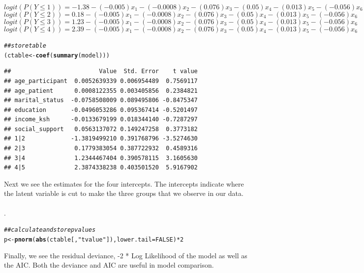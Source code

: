 \documentclass[12pt]{article}\usepackage[]{graphicx}\usepackage[]{xcolor}
\makeatletter
\newcommand{\hlnum}[1]{\textcolor[rgb]{0.686,0.059,0.569}{#1}}%
\newcommand{\hlstr}[1]{\textcolor[rgb]{0.192,0.494,0.8}{#1}}%
\newcommand{\hlcom}[1]{\textcolor[rgb]{0.678,0.584,0.686}{\textit{#1}}}%
\newcommand{\hlopt}[1]{\textcolor[rgb]{0,0,0}{#1}}%
\newcommand{\hlstd}[1]{\textcolor[rgb]{0.345,0.345,0.345}{#1}}%
\newcommand{\hlkwb}[1]{\textcolor[rgb]{0.69,0.353,0.396}{#1}}%
\newcommand{\hlkwc}[1]{\textcolor[rgb]{0.333,0.667,0.333}{#1}}%
\newcommand{\hlkwd}[1]{\textcolor[rgb]{0.737,0.353,0.396}{\textbf{#1}}}%
\newenvironment{kframe}{%
 \def\at@end@of@kframe{}%
 \ifinner\ifhmode%
  \def\at@end@of@kframe{\end{minipage}}%
  \begin{minipage}{\columnwidth}%
 \fi\fi%
 \def\FrameCommand##1{\hskip\@totalleftmargin \hskip-\fboxsep
 \colorbox{shadecolor}{##1}\hskip-\fboxsep
     \hskip-\linewidth \hskip-\@totalleftmargin \hskip\columnwidth}%
 \MakeFramed {\advance\hsize-\width
   \@totalleftmargin\z@ \linewidth\hsize
   \@setminipage}}%
 {\par\unskip\endMakeFramed%
 \at@end@of@kframe}
\newenvironment{knitrout}{}{} %
\numberwithin{equation}{section}
\numberwithin{figure}{section}
\makeatother
\begin{document}
$$logit(P(Y \leq 1)) = -1.38 - (-0.005)x_1 - (-0.0008)x_2 - (0.076)x_3 -(0.05)x_4 -(0.013)x_5 - (-0.056)x_6$$
$$	logit(P(Y \leq 2)) = 0.18 - (-0.005)x_1 - (-0.0008)x_2 - (0.076)x_3 -(0.05)x_4 -(0.013)x_5 - (-0.056)x_6$$
$$logit(P(Y \leq 3)) = 1.23-(-0.005)x_1 - (-0.0008)x_2 - (0.076)x_3 -(0.05)x_4 -(0.013)x_5 - (-0.056)x_6$$
$$logit(P(Y \leq 4)) = 2.39 - (-0.005)x_1 - (-0.0008)x_2 - (0.076)x_3 -(0.05)x_4 -(0.013)x_5 - (-0.056)x_6$$

\begin{knitrout}
\color{fgcolor}\begin{kframe}
\begin{alltt}
\hlcom{## store table}
\hlstd{(ctable} \hlkwb{<-} \hlkwd{coef}\hlstd{(}\hlkwd{summary}\hlstd{(model)))}
\end{alltt}
\begin{verbatim}
##                         Value  Std. Error    t value
## age_participant  0.0052639339 0.006954489  0.7569117
## age_patient      0.0008122355 0.003405856  0.2384821
## marital_status  -0.0758508009 0.089495806 -0.8475347
## education       -0.0496053286 0.095367414 -0.5201497
## income_ksh      -0.0133679199 0.018344140 -0.7287297
## social_support   0.0563137072 0.149247258  0.3773182
## 1|2             -1.3819499210 0.391768796 -3.5274630
## 2|3              0.1779383054 0.387722932  0.4589316
## 3|4              1.2344467404 0.390578115  3.1605630
## 4|5              2.3874338238 0.403501520  5.9167902
\end{verbatim}
\end{kframe}
\end{knitrout}

\noindent Next we see the estimates for the four intercepts. The intercepts indicate where the latent variable is cut to make the three groups that we observe in our data. \\~\\.


\begin{knitrout}
\color{fgcolor}\begin{kframe}
\begin{alltt}
\hlcom{## calculate and store p values}
\hlstd{p} \hlkwb{<-} \hlkwd{pnorm}\hlstd{(}\hlkwd{abs}\hlstd{(ctable[,} \hlstr{"t value"}\hlstd{]),} \hlkwc{lower.tail} \hlstd{=} \hlnum{FALSE}\hlstd{)} \hlopt{*} \hlnum{2}
\end{alltt}
\end{kframe}
\end{knitrout}
\noindent Finally, we see the residual deviance, -2 * Log Likelihood of the model as well as the AIC. Both the deviance and AIC are useful in model comparison.
\end{document}
